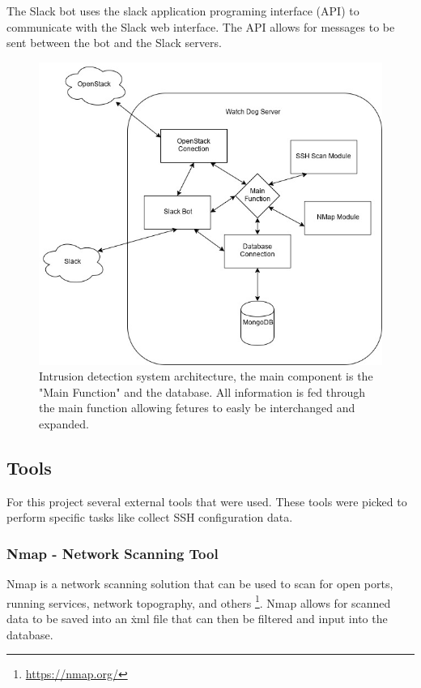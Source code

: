 \documentclass[12pt]{article}
\begin{document}
The Slack bot uses the slack application programing interface (API) to communicate with the Slack web interface. The API allows for messages to be sent between the bot and the Slack servers.

\begin{figure}[ht]
    \includegraphics[scale=.5]{./pic/Arcitecture.png}
    \caption{Intrusion detection system architecture, the main component is the "Main Function" and the database. All information is fed through the main function allowing fetures to easly be interchanged and expanded.}
\end{figure}

\newpage

\subsection{Tools}
For this project several external tools that were used. These tools were picked to perform specific tasks like collect SSH configuration data.

\subsubsection{Nmap - Network Scanning Tool}
Nmap is a network scanning solution that can be used to scan for open ports, running services, network topography, and others \footnote{\href{https://nmap.org/}{https://nmap.org/}}. Nmap allows for scanned data to be saved into an \.xml file that can then be filtered and input into the database.
\end{document}
